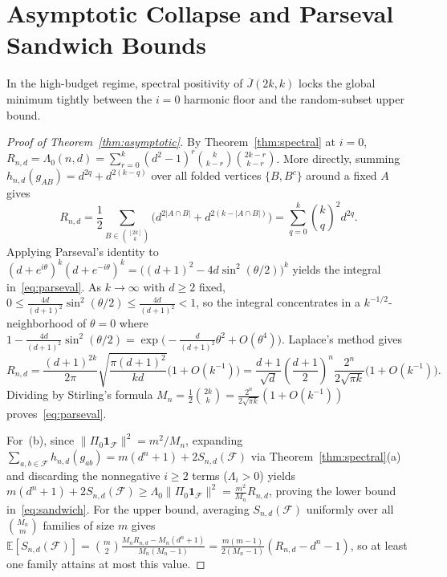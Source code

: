 \documentclass[11pt,reqno]{amsart}
\theoremstyle{definition}
\theoremstyle{remark}
\newcommand{\E}{\mathbb{E}}
\newcommand{\Jbar}{\overline{J}}
\newcommand{\F}{\mathcal{F}}
\begin{document}
\section{Asymptotic Collapse and Parseval Sandwich Bounds}\label{sec:asymptotics}

In the high-budget regime, spectral positivity of $\Jbar(2k,k)$ locks the global minimum tightly between the $i=0$ harmonic floor and the random-subset upper bound.

\begin{proof}[Proof of Theorem~\ref{thm:asymptotic}]
By Theorem~\ref{thm:spectral} at $i=0$, $R_{n,d} = \Lambda_0(n,d) = \sum_{r=0}^k (d^2-1)^r \binom{k}{k-r}\binom{2k-r}{k-r}$. More directly, summing $h_{n,d}(g_{AB}) = d^{2q} + d^{2(k-q)}$ over all folded vertices $\{B, B^c\}$ around a fixed $A$ gives
\[
R_{n,d} = \frac{1}{2}\sum_{B \in \binom{[2k]}{k}} \bigl(d^{2|A\cap B|} + d^{2(k-|A\cap B|)}\bigr) = \sum_{q=0}^k \binom{k}{q}^2 d^{2q}.
\]
Applying Parseval's identity to $(d + e^{i\theta})^k (d + e^{-i\theta})^k = \bigl((d+1)^2 - 4d\sin^2(\theta/2)\bigr)^k$ yields the integral in~\eqref{eq:parseval}. As $k \to \infty$ with $d \ge 2$ fixed, $0 \le \frac{4d}{(d+1)^2}\sin^2(\theta/2) \le \frac{4d}{(d+1)^2} < 1$, so the integral concentrates in a $k^{-1/2}$-neighborhood of $\theta = 0$ where $1 - \frac{4d}{(d+1)^2}\sin^2(\theta/2) = \exp\bigl(-\frac{d}{(d+1)^2}\theta^2 + O(\theta^4)\bigr)$. Laplace's method gives
\[
R_{n,d} = \frac{(d+1)^{2k}}{2\pi}\sqrt{\frac{\pi(d+1)^2}{kd}}\bigl(1 + O(k^{-1})\bigr) = \frac{d+1}{\sqrt{d}}\left(\frac{d+1}{2}\right)^n \frac{2^n}{2\sqrt{\pi k}}\bigl(1 + O(k^{-1})\bigr).
\]
Dividing by Stirling's formula $M_n = \frac{1}{2}\binom{2k}{k} = \frac{2^n}{2\sqrt{\pi k}}(1 + O(k^{-1}))$ proves~\eqref{eq:parseval}.

For~(b), since $\|\Pi_0 \mathbf{1}_{\F}\|^2 = m^2/M_n$, expanding $\sum_{a,b \in \F} h_{n,d}(g_{ab}) = m(d^n + 1) + 2 S_{n,d}(\F)$ via Theorem~\ref{thm:spectral}(a) and discarding the nonnegative $i \ge 2$ terms ($\Lambda_i > 0$) yields $m(d^n + 1) + 2 S_{n,d}(\F) \ge \Lambda_0 \|\Pi_0 \mathbf{1}_{\F}\|^2 = \frac{m^2}{M_n} R_{n,d}$, proving the lower bound in~\eqref{eq:sandwich}. For the upper bound, averaging $S_{n,d}(\F)$ uniformly over all $\binom{M_n}{m}$ families of size $m$ gives $\E[S_{n,d}(\F)] = \binom{m}{2}\frac{M_n R_{n,d} - M_n(d^n+1)}{M_n(M_n-1)} = \frac{m(m-1)}{2(M_n-1)}(R_{n,d} - d^n - 1)$, so at least one family attains at most this value.


\end{proof}
\end{document}
